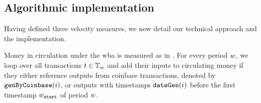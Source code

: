 \subsection{Algorithmic implementation}
\label{sec:cc_money_seg:sub:mcirc_pract}%
Having defined three velocity measures, we now detail our technical approach
and the implementation.

Money in circulation under the \ac{wba} is measured as in
.  %
For every period ${w}$, we loop over all transactions $t\in{\mathbb{T}_{w}}$ and add
their inputs to circulating money if they either reference outputs from
coinbase transactions, denoted by ${\mathtt{genByCoinbase}}(i)$, or outputs with
timestamps ${\mathtt{dateGen}}(i)$ before the first timestamp ${w}_{\mathtt{start}}$ of period
${w}$.  %
%
%
%


